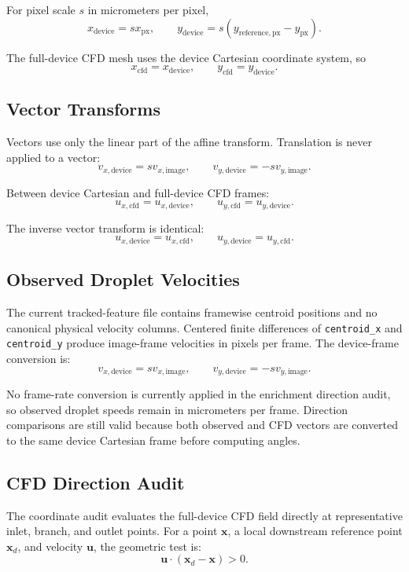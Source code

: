 For pixel scale \(s\) in micrometers per pixel,
\[
  x_{\mathrm{device}} = s x_{\mathrm{px}},
  \qquad
  y_{\mathrm{device}} = s(y_{\mathrm{reference,px}} - y_{\mathrm{px}}).
\]

The full-device CFD mesh uses the device Cartesian coordinate system, so
\[
  x_{\mathrm{cfd}} = x_{\mathrm{device}},
  \qquad
  y_{\mathrm{cfd}} = y_{\mathrm{device}}.
\]

\subsection{Vector Transforms}

Vectors use only the linear part of the affine transform. Translation is never
applied to a vector:
\[
  v_{x,\mathrm{device}} = s v_{x,\mathrm{image}},
  \qquad
  v_{y,\mathrm{device}} = -s v_{y,\mathrm{image}}.
\]

Between device Cartesian and full-device CFD frames:
\[
  u_{x,\mathrm{cfd}} = u_{x,\mathrm{device}},
  \qquad
  u_{y,\mathrm{cfd}} = u_{y,\mathrm{device}}.
\]

The inverse vector transform is identical:
\[
  u_{x,\mathrm{device}} = u_{x,\mathrm{cfd}},
  \qquad
  u_{y,\mathrm{device}} = u_{y,\mathrm{cfd}}.
\]

\subsection{Observed Droplet Velocities}

The current tracked-feature file contains framewise centroid positions and no
canonical physical velocity columns. Centered finite differences of
\texttt{centroid\_x} and \texttt{centroid\_y} produce image-frame velocities in
pixels per frame. The device-frame conversion is:
\[
  v_{x,\mathrm{device}} = s v_{x,\mathrm{image}},
  \qquad
  v_{y,\mathrm{device}} = -s v_{y,\mathrm{image}}.
\]

No frame-rate conversion is currently applied in the enrichment direction audit,
so observed droplet speeds remain in micrometers per frame. Direction
comparisons are still valid because both observed and CFD vectors are converted
to the same device Cartesian frame before computing angles.

\subsection{CFD Direction Audit}

The coordinate audit evaluates the full-device CFD field directly at
representative inlet, branch, and outlet points. For a point \(\mathbf{x}\), a
local downstream reference point \(\mathbf{x}_d\), and velocity \(\mathbf{u}\),
the geometric test is:
\[
  \mathbf{u}\cdot(\mathbf{x}_d-\mathbf{x}) > 0.
\]

